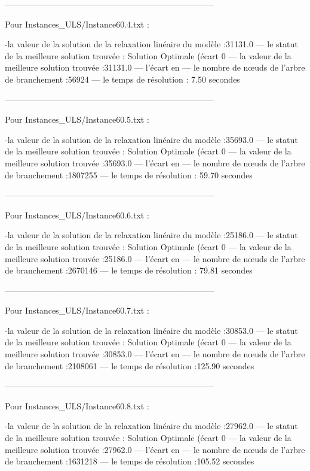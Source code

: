 ---------------------------------------------------------------------------

Pour Instances_ULS/Instance60.4.txt :


-la valeur de la solution de la relaxation linéaire du modèle :31131.0
— le statut de la meilleure solution trouvée : Solution Optimale (écart 0%
— la valeur de la meilleure solution trouvée :31131.0
— l’écart en %
— le nombre de nœuds de l’arbre de branchement :56924
— le temps de résolution : 7.50 secondes


---------------------------------------------------------------------------

Pour Instances_ULS/Instance60.5.txt :


-la valeur de la solution de la relaxation linéaire du modèle :35693.0
— le statut de la meilleure solution trouvée : Solution Optimale (écart 0%
— la valeur de la meilleure solution trouvée :35693.0
— l’écart en %
— le nombre de nœuds de l’arbre de branchement :1807255
— le temps de résolution : 59.70 secondes


---------------------------------------------------------------------------

Pour Instances_ULS/Instance60.6.txt :


-la valeur de la solution de la relaxation linéaire du modèle :25186.0
— le statut de la meilleure solution trouvée : Solution Optimale (écart 0%
— la valeur de la meilleure solution trouvée :25186.0
— l’écart en %
— le nombre de nœuds de l’arbre de branchement :2670146
— le temps de résolution : 79.81 secondes


---------------------------------------------------------------------------

Pour Instances_ULS/Instance60.7.txt :


-la valeur de la solution de la relaxation linéaire du modèle :30853.0
— le statut de la meilleure solution trouvée : Solution Optimale (écart 0%
— la valeur de la meilleure solution trouvée :30853.0
— l’écart en %
— le nombre de nœuds de l’arbre de branchement :2108061
— le temps de résolution :125.90  secondes


---------------------------------------------------------------------------

Pour Instances_ULS/Instance60.8.txt :


-la valeur de la solution de la relaxation linéaire du modèle :27962.0
— le statut de la meilleure solution trouvée : Solution Optimale (écart 0%
— la valeur de la meilleure solution trouvée :27962.0
— l’écart en %
— le nombre de nœuds de l’arbre de branchement :1631218 
— le temps de résolution :105.52 secondes


